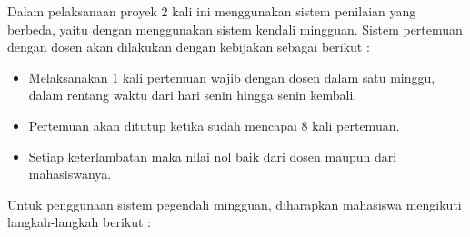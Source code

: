 \par Dalam pelaksanaan proyek 2 kali ini menggunakan sistem penilaian yang berbeda, yaitu dengan menggunakan sistem kendali mingguan. Sistem pertemuan dengan dosen akan dilakukan dengan kebijakan sebagai berikut :
\begin{itemize}

\item Melaksanakan 1 kali pertemuan wajib dengan dosen dalam satu minggu, dalam rentang waktu dari hari senin hingga senin kembali.

\item Pertemuan akan ditutup ketika sudah mencapai 8 kali pertemuan.

\item  Setiap keterlambatan maka nilai nol baik dari dosen maupun dari mahasiswanya.

\end{itemize} 

\par Untuk penggunaan sistem pegendali mingguan, diharapkan mahasiswa mengikuti langkah-langkah berikut :

